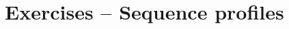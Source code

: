 \documentclass[12pt, answers]{exam}
\begin{document}
\section{Exercises -- Sequence profiles}

\begin{questions}







\end{questions}
       
\end{document}
